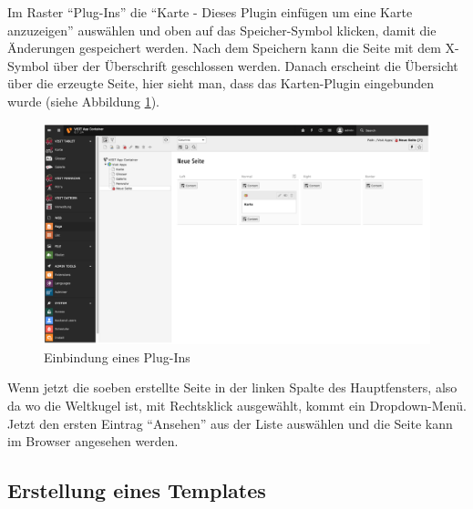 Im Raster “Plug-Ins” die “Karte - Dieses Plugin einfügen um eine Karte anzuzeigen” auswählen und oben auf das Speicher-Symbol klicken, damit die Änderungen gespeichert werden. Nach dem Speichern kann die Seite mit dem X-Symbol über der Überschrift geschlossen werden. Danach erscheint die Übersicht über die erzeugte Seite, hier sieht man, dass das Karten-Plugin eingebunden wurde (siehe Abbildung \ref{img:einbindung_plugins}).

\begin{figure}[ht!]
\centering
\includegraphics[width=12cm]{Figures/paula/typo3/einbindung_plugin.png}
\caption{Einbindung eines Plug-Ins}
\label{img:einbindung_plugins}
\end{figure}

Wenn jetzt die soeben erstellte Seite in der linken Spalte des Hauptfensters, also da wo die Weltkugel ist, mit Rechtsklick ausgewählt, kommt ein Dropdown-Menü. Jetzt den ersten Eintrag “Ansehen” aus der Liste auswählen und die Seite kann im Browser angesehen werden.

\subsection{Erstellung eines Templates}

